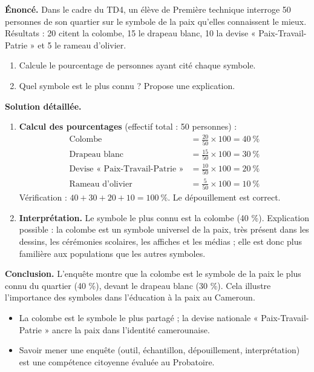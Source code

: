 \documentclass[11pt]{article}
\newcommand{\cle}[1]{{\popxbold\color{popdark}#1}}
\begin{document}
\begin{exoresolu}
\textbf{Énoncé.} Dans le cadre du TD4, un élève de Première technique interroge 50 personnes de son quartier sur le symbole de la paix qu'elles connaissent le mieux. Résultats : 20 citent la colombe, 15 le drapeau blanc, 10 la devise « Paix-Travail-Patrie » et 5 le rameau d'olivier.
\begin{enumerate}
\item Calcule le pourcentage de personnes ayant cité chaque symbole.
\item Quel symbole est le plus connu ? Propose une explication.
\end{enumerate}
\tcblower
\textbf{Solution détaillée.}
\begin{enumerate}
\item \textbf{Calcul des pourcentages} (effectif total : 50 personnes) :
\begin{align*}
\text{Colombe} &= \frac{20}{50} \times 100 = 40\ \%\\
\text{Drapeau blanc} &= \frac{15}{50} \times 100 = 30\ \%\\
\text{Devise « Paix-Travail-Patrie »} &= \frac{10}{50} \times 100 = 20\ \%\\
\text{Rameau d'olivier} &= \frac{5}{50} \times 100 = 10\ \%
\end{align*}
Vérification : $40 + 30 + 20 + 10 = 100\ \%$. Le dépouillement est correct.
\item \textbf{Interprétation.} Le symbole le plus connu est la \cle{colombe} (40 \%). Explication possible : la colombe est un symbole universel de la paix, très présent dans les dessins, les cérémonies scolaires, les affiches et les médias ; elle est donc plus familière aux populations que les autres symboles.
\end{enumerate}
\textbf{Conclusion.} L'enquête montre que la colombe est le symbole de la paix le plus connu du quartier (40 \%), devant le drapeau blanc (30 \%). Cela illustre l'importance des symboles dans l'éducation à la paix au Cameroun.
\end{exoresolu}

\begin{aretenir}[Bilan du TD4]
\begin{itemize}
\item La colombe est le symbole le plus partagé ; la devise nationale « Paix-Travail-Patrie » ancre la paix dans l'identité camerounaise.
\item Savoir mener une enquête (outil, échantillon, dépouillement, interprétation) est une compétence citoyenne évaluée au Probatoire.
\end{itemize}
\end{aretenir}
\end{document}
